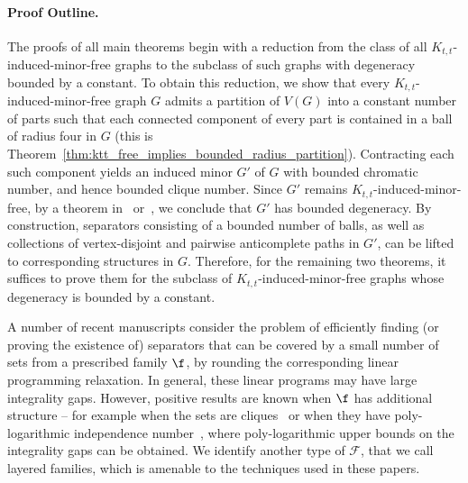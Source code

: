 \paragraph{Proof Outline.}


The proofs of all main theorems begin with a reduction from the class of all $K_{t,t}$-induced-minor-free graphs to the subclass of such graphs with degeneracy bounded by a constant.
% 
To obtain this reduction, we show that every $K_{t,t}$-induced-minor-free graph $G$ admits a partition of $V(G)$ into a constant number of parts such that each connected component of every part is contained in a ball of radius four in $G$ (this is Theorem~\ref{thm:ktt_free_implies_bounded_radius_partition}). Contracting each such component yields an induced minor $G'$ of $G$ with bounded chromatic number, and hence bounded clique number. Since $G'$ remains $K_{t,t}$-induced-minor-free, by a theorem in~\cite{MatijaPolyDegen} or~\cite{10.1093/imrn/rnaf025}, we conclude that $G'$ has bounded degeneracy.
% 
% 
By construction, separators consisting of a bounded number of balls, as well as collections of vertex-disjoint and pairwise anticomplete paths in $G'$, can be lifted to corresponding structures in $G$. Therefore, for the remaining two theorems, it suffices to prove them for the subclass of $K_{t,t}$-induced-minor-free graphs whose degeneracy is bounded by a constant.


A number of recent 
manuscripts
consider the problem of efficiently finding (or proving the existence of) separators that can be covered by a small number of sets from a prescribed family $\f$, by rounding the corresponding linear programming relaxation. In general, these linear programs may have large integrality gaps. However, positive results are known when $\f$ has additional structure -- for example when the sets are cliques~\cite{KorchemnaL0S024} or when they have poly-logarithmic independence number~\cite{chudnovsky2025treewidth}, where poly-logarithmic upper bounds on the integrality gaps can be obtained. We identify another type of $\mathcal{F}$, that we call layered families, which is amenable to the techniques used in these papers.

